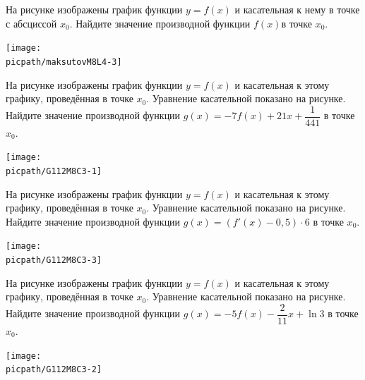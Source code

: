 \begin{consultation}
\begin{listofex}
\begin{minipage}[t]{\picwidth}
		\end{minipage}
		\item
		\begin{minipage}[t]{\bodywidth}
			На рисунке изображены график функции \(y=f(x)\) и касательная к нему в точке с абсциссой \(x_0\). Найдите значение производной функции \(f(x)\)в точке \(x_0\).
		\end{minipage}
		\hspace{0.02\linewidth}
		\begin{minipage}[t]{\picwidth}
			\texttt{[image: \\picpath/maksutovM8L4-3]}
		\end{minipage}
		\item
		\begin{minipage}[t]{\bodywidth}
			На рисунке изображены график функции \(y=f(x)\) и касательная к этому графику, проведённая в точке \(x_0\). Уравнение касательной показано на рисунке. Найдите значение производной функции \(g(x)=-7f(x)+21x+\dfrac{ 1 }{ 441 }\) в точке \(x_0\).
		\end{minipage}
		\hspace{0.02\linewidth}
		\begin{minipage}[t]{\picwidth}
			\texttt{[image: \\picpath/G112M8C3-1]}
		\end{minipage}
		\item
		\begin{minipage}[t]{\bodywidth}
			На рисунке изображены график функции \(y=f(x)\) и касательная к этому графику, проведённая в точке \(x_0\). Уравнение касательной показано на рисунке. Найдите значение производной функции \(g(x)=(f'(x)-0,5)\cdot 6\) в точке \(x_0\).
		\end{minipage}
		\hspace{0.02\linewidth}
		\begin{minipage}[t]{\picwidth}
			\texttt{[image: \\picpath/G112M8C3-3]}
		\end{minipage}
		\item
		\begin{minipage}[t]{\bodywidth}
			На рисунке изображены график функции \(y=f(x)\) и касательная к этому графику, проведённая в точке \(x_0\). Уравнение касательной показано на рисунке. Найдите значение производной функции \(g(x)=-5f(x)-\dfrac{ 2 }{ 11 }x+\ln3\) в точке \(x_0\).
		\end{minipage}
		\hspace{0.02\linewidth}
		\begin{minipage}[t]{\picwidth}
			\texttt{[image: \\picpath/G112M8C3-2]}
		\end{minipage}
		

\end{listofex}
\end{consultation}
